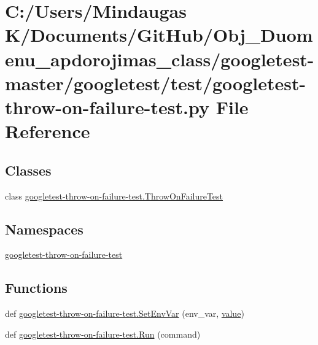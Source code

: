 \hypertarget{googletest-master_2googletest_2test_2googletest-throw-on-failure-test_8py}{}\section{C\+:/\+Users/\+Mindaugas K/\+Documents/\+Git\+Hub/\+Obj\+\_\+\+Duomenu\+\_\+apdorojimas\+\_\+class/googletest-\/master/googletest/test/googletest-\/throw-\/on-\/failure-\/test.py File Reference}
\label{googletest-master_2googletest_2test_2googletest-throw-on-failure-test_8py}
\subsection*{Classes}
\begin{DoxyCompactItemize}
\item 
class \mbox{\hyperlink{classgoogletest-throw-on-failure-test_1_1_throw_on_failure_test}{googletest-\/throw-\/on-\/failure-\/test.\+Throw\+On\+Failure\+Test}}
\end{DoxyCompactItemize}
\subsection*{Namespaces}
\begin{DoxyCompactItemize}
\item 
 \mbox{\hyperlink{namespacegoogletest-throw-on-failure-test}{googletest-\/throw-\/on-\/failure-\/test}}
\end{DoxyCompactItemize}
\subsection*{Functions}
\begin{DoxyCompactItemize}
\item 
def \mbox{\hyperlink{namespacegoogletest-throw-on-failure-test_a2e2bb374a68e4ae1db7c359b8005cbcc}{googletest-\/throw-\/on-\/failure-\/test.\+Set\+Env\+Var}} (env\+\_\+var, \mbox{\hyperlink{_obj__test_2lib_2googletest-master_2googlemock_2test_2gmock-matchers__test_8cc_a337b8a670efc0b086ad3af163f3121b6}{value}})
\item 
def \mbox{\hyperlink{namespacegoogletest-throw-on-failure-test_a937ab7ba6dcd93d71b1997f2bbfe3804}{googletest-\/throw-\/on-\/failure-\/test.\+Run}} (command)
\end{DoxyCompactItemize}

